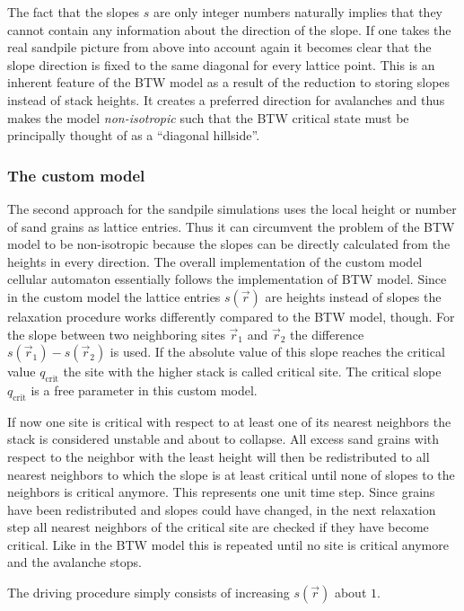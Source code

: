 The fact that the slopes $s$ are only integer numbers naturally implies that they cannot contain any information about
the direction of the slope. If one takes the real sandpile picture from above into account again it becomes clear that
the slope direction is fixed to the same diagonal for every lattice point. This is an inherent feature of the BTW model
as a result of the reduction to storing slopes instead of stack heights. It creates a preferred direction for avalanches
and thus makes the model \emph{non-isotropic} such that the BTW critical state must be principally thought of as a
\enquote{diagonal hillside}.

\subsubsection{The custom model}
The second approach for the sandpile simulations uses the local height or number of sand grains as lattice entries.
Thus it can circumvent the problem of the BTW model to be non-isotropic because the slopes can be directly calculated
from the heights in every direction.
The overall implementation of the custom model cellular automaton essentially follows the implementation of BTW model.
Since in the custom model the lattice entries $s(\vec{r})$ are heights instead of slopes the relaxation procedure
works differently compared to the BTW model, though.
For the slope between two neighboring sites $\vec{r}_1$ and $\vec{r}_2$ the difference $s(\vec{r}_1)-s(\vec{r}_2)$ is
used. If the absolute value of this slope reaches the critical value $q_{\mathrm{crit}}$ the site with the higher
stack is called critical site. The critical slope $q_{\mathrm{crit}}$ is a free parameter in this custom model.

If now one site is critical with respect to at least one of its nearest neighbors the stack is considered unstable
and about to collapse. All excess sand grains with respect to the neighbor with the least height will then be
redistributed to all nearest neighbors to which the slope is at least critical until none of slopes to the neighbors
is critical anymore. This represents one unit time step.
Since grains have been redistributed and slopes could have changed, in the next relaxation step all nearest neighbors
of the critical site are checked if they have become critical. Like in the BTW model this is repeated until no site
is critical anymore and the avalanche stops.

The driving procedure simply consists of increasing $s(\vec{r})$ about $1$.

